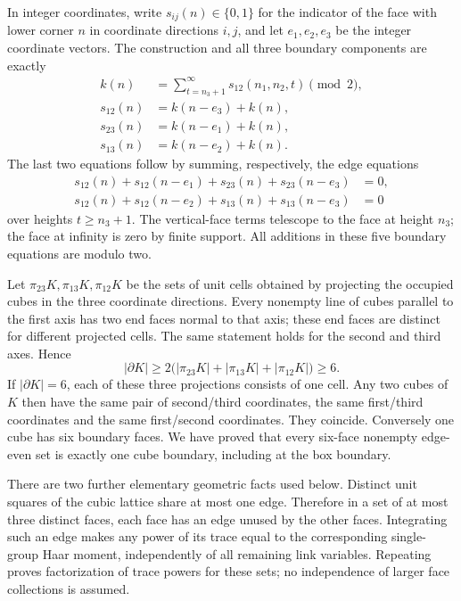 \documentclass[11pt]{article}
\begin{document}
In integer coordinates, write \(s_{ij}(n)\in\{0,1\}\) for the indicator of
the face with lower corner \(n\) in coordinate directions \(i,j\), and let
\(e_1,e_2,e_3\) be the integer coordinate vectors. The construction and all
three boundary components are exactly
\[
\begin{aligned}
 k(n)&=\sum_{t=n_3+1}^{\infty}s_{12}(n_1,n_2,t)\pmod2,\\
 s_{12}(n)&=k(n-e_3)+k(n),\\
 s_{23}(n)&=k(n-e_1)+k(n),\\
 s_{13}(n)&=k(n-e_2)+k(n).
\end{aligned}
\]
The last two equations follow by summing, respectively, the edge equations
\[
\begin{aligned}
 s_{12}(n)+s_{12}(n-e_1)+s_{23}(n)+s_{23}(n-e_3)&=0,\\
 s_{12}(n)+s_{12}(n-e_2)+s_{13}(n)+s_{13}(n-e_3)&=0
\end{aligned}
\]
over heights \(t\ge n_3+1\). The vertical-face terms telescope to the
face at height \(n_3\); the face at infinity is zero by finite support.
All additions in these five boundary equations are modulo two.

Let \(\pi_{23}K,\pi_{13}K,\pi_{12}K\) be the sets of unit cells obtained by
projecting the occupied cubes in the three coordinate directions. Every
nonempty line of cubes parallel to the first axis has two end faces
normal to that axis; these end faces are distinct for different projected
cells. The same statement holds for the second and third axes. Hence
\[
 |\partial K|\ge
 2\bigl(|\pi_{23}K|+|\pi_{13}K|+|\pi_{12}K|\bigr)\ge6.
\]
If \(|\partial K|=6\), each of these three projections consists of one cell.
Any two cubes of \(K\) then have the same pair of second/third coordinates,
the same first/third coordinates and the same first/second coordinates.
They coincide. Conversely one cube has six boundary faces. We have proved
that every six-face nonempty edge-even set is exactly one cube boundary,
including at the box boundary.

There are two further elementary geometric facts used below. Distinct unit
squares of the cubic lattice share at most one edge. Therefore in a set
of at most three distinct faces, each face has an edge unused by the other
faces. Integrating such an edge makes any power of its trace equal to the
corresponding single-group Haar moment, independently of all remaining
link variables. Repeating proves factorization of trace powers for these
sets; no independence of larger face collections is assumed.
\end{document}
